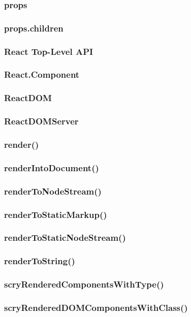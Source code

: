 \documentclass{book}
\begin{document}
\begin{CJK*}{UTF8}{gbsn}
\subsubsection{props}
\subsubsection{props.children}
\subsubsection{React Top-Level API}
\subsubsection{React.Component}
\subsubsection{ReactDOM}
\subsubsection{ReactDOMServer}
\subsubsection{render()}
\subsubsection{renderIntoDocument()}
\subsubsection{renderToNodeStream()}
\subsubsection{renderToStaticMarkup()}
\subsubsection{renderToStaticNodeStream()}
\subsubsection{renderToString()}
\subsubsection{scryRenderedComponentsWithType()}
\subsubsection{scryRenderedDOMComponentsWithClass()}

\end{CJK*}
\end{document}
